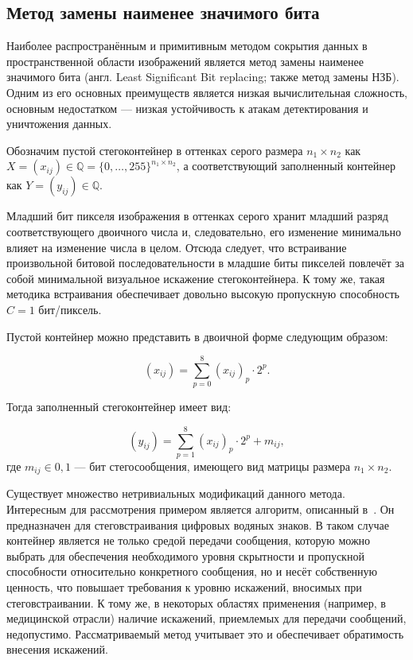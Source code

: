 \subsection{Метод замены наименее значимого бита} \label{sec:LSB}

Наиболее распространённым и примитивным методом сокрытия данных в пространственной области изображений является метод замены наименее значимого бита (англ. Least Significant Bit replacing; также метод замены НЗБ). Одним из его основных преимуществ является низкая вычислительная сложность, основным недостатком --- низкая устойчивость к атакам детектирования и уничтожения данных.

Обозначим пустой стегоконтейнер в оттенках серого размера $ {n_1 \times n_2} $ как $ X = (x_{ij}) \in \mathbb{Q} = \{0, \dotsc, 255\}^{n_1 \times n_2} $, а соответствующий заполненный контейнер как $ Y = (y_{ij}) \in \mathbb{Q} $.

Младший бит пикселя изображения в оттенках серого хранит младший разряд соответствующего двоичного числа и, следовательно, его изменение минимально влияет на изменение числа в целом. Отсюда следует, что встраивание произвольной битовой последовательности в младшие биты пикселей повлечёт за собой минимальной визуальное искажение стегоконтейнера. К тому же, такая методика встраивания обеспечивает довольно высокую пропускную способность $ C = 1 $ бит/пиксель.

Пустой контейнер можно представить в двоичной форме следующим образом:

\begin{equation*}
(x_{ij}) = \sum_{p = 0}^8 (x_{ij})_p \cdot 2^p.
\end{equation*}

Тогда заполненный стегоконтейнер имеет вид:

\begin{equation*}
(y_{ij}) = \sum_{p = 1}^8 (x_{ij})_p \cdot 2^p + m_{ij},
\end{equation*}
где $ m_{ij} \in {0, 1} $ --- бит стегосообщения, имеющего вид матрицы размера $ {n_1 \times n_2} $.

Существует множество нетривиальных модификаций данного метода. Интересным для рассмотрения примером является алгоритм, описанный в~\cite{FridrichLossless}. Он предназначен для стеговстраивания цифровых водяных знаков. В таком случае контейнер является не только средой передачи сообщения, которую можно выбрать для обеспечения необходимого уровня скрытности и пропускной способности относительно конкретного сообщения, но и несёт собственную ценность, что повышает требования к уровню искажений, вносимых при стеговстраивании. К тому же, в некоторых областях применения (например, в медицинской отрасли) наличие искажений, приемлемых для передачи сообщений, недопустимо. Рассматриваемый метод учитывает это и обеспечивает обратимость внесения искажений.

